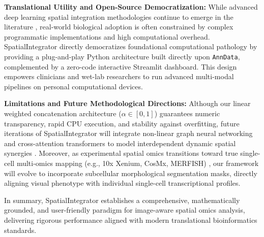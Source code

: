\documentclass[11pt, a4paper]{article}
\begin{document}
\textbf{Translational Utility and Open-Source Democratization:} While advanced deep learning spatial integration methodologies continue to emerge in the literature \cite{yang2025staig, wang2025stimage}, real-world biological adoption is often constrained by complex programmatic implementations and high computational overhead. SpatialIntegrator directly democratizes foundational computational pathology by providing a plug-and-play Python architecture built directly upon \texttt{AnnData}, complemented by a zero-code interactive Streamlit dashboard. This design empowers clinicians and wet-lab researchers to run advanced multi-modal pipelines on personal computational devices.

\textbf{Limitations and Future Methodological Directions:} Although our linear weighted concatenation architecture ($\alpha \in [0,1]$) guarantees numeric transparency, rapid CPU execution, and stability against overfitting, future iterations of SpatialIntegrator will integrate non-linear graph neural networking and cross-attention transformers to model interdependent dynamic spatial synergies \cite{luo2025deep, kipf2017semi}. Moreover, as experimental spatial omics transitions toward true single-cell multi-omics mapping (e.g., 10x Xenium, CosMx, MERFISH) \cite{janesick2023high, fu2024bidcell}, our framework will evolve to incorporate subcellular morphological segmentation masks, directly aligning visual phenotype with individual single-cell transcriptional profiles.

In summary, SpatialIntegrator establishes a comprehensive, mathematically grounded, and user-friendly paradigm for image-aware spatial omics analysis, delivering rigorous performance aligned with modern translational bioinformatics standards.
\end{document}
